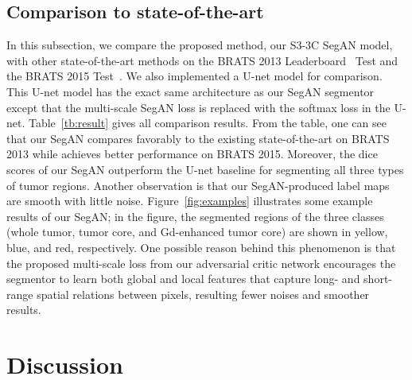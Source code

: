 \documentclass[twocolumn]{svjour3}
\begin{document}
\subsection{Comparison to state-of-the-art}
In this subsection, we compare the proposed method, our S3-3C SegAN model, with other state-of-the-art methods on the BRATS 2013 Leaderboard~\cite{havaei2017brain,pereira2016brain} Test and the BRATS 2015 Test~\cite{kamnitsas2017efficient}.
We also implemented a U-net model \cite{ronneberger2015u} for comparison. This U-net model has the exact same architecture as our SegAN segmentor except that the multi-scale SegAN loss is replaced with the softmax loss in the U-net. Table~\ref{tb:result} gives all comparison results. From the table, one can see that our SegAN compares favorably to the existing state-of-the-art on BRATS 2013 while achieves better performance on BRATS 2015.
Moreover, the dice scores of our SegAN outperform the U-net baseline for segmenting all three types of tumor regions.  Another observation is that our SegAN-produced label maps are smooth with little noise.  Figure~\ref{fig:examples} illustrates some example results of our SegAN; in the figure, the segmented regions of the three classes (whole tumor, tumor core, and Gd-enhanced tumor core) are shown in yellow, blue, and red, respectively. One possible reason behind this phenomenon is that the proposed multi-scale  loss from our adversarial critic network encourages the segmentor to learn both global and local features that capture long- and short-range spatial relations between pixels, resulting fewer noises and smoother results.








\section{Discussion}
\end{document}
